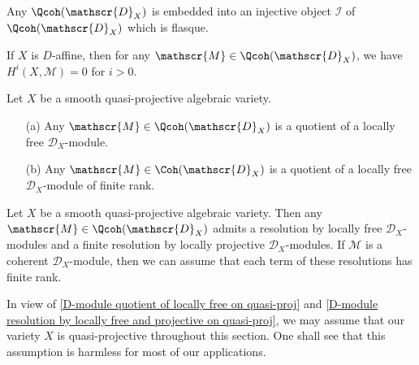 \begin{proposition}\label{D-module qcoh module flasque resolution}
Any $\Qcoh(\mathscr{D}_X)$ is embedded into an injective object $\mathscr{I}$ of $\Qcoh(\mathscr{D}_X)$ which is flasque.
\end{proposition}

\begin{corollary}\label{D-module cohomology trivial for D-affine}
If $X$ is $D$-affine, then for any $\mathscr{M}\in\Qcoh(\mathscr{D}_X)$, we have $H^i(X,\mathscr{M})=0$ for $i>0$.
\end{corollary}

\begin{proposition}\label{D-module quotient of locally free on quasi-proj}
Let $X$ be a smooth quasi-projective algebraic variety.
\begin{enumerate}
    \item[(a)] Any $\mathscr{M}\in\Qcoh(\mathscr{D}_X)$ is a quotient of a locally free $\mathscr{D}_X$-module.
    \item[(b)] Any $\mathscr{M}\in\Coh(\mathscr{D}_X)$ is a quotient of a locally free $\mathscr{D}_X$-module of finite rank.
\end{enumerate}
\end{proposition}

\begin{corollary}\label{D-module resolution by locally free and projective on quasi-proj}
Let $X$ be a smooth quasi-projective algebraic variety. Then any $\mathscr{M}\in\Qcoh(\mathscr{D}_X)$ admits a resolution by locally free $\mathscr{D}_X$-modules and a finite resolution by locally projective $\mathscr{D}_X$-modules. If $\mathscr{M}$ is a coherent $\mathscr{D}_X$-module, then we can assume that each term of these resolutions has finite rank.
\end{corollary}

\begin{remark}
In view of \cref{D-module quotient of locally free on quasi-proj} and \cref{D-module resolution by locally free and projective on quasi-proj}, we may assume that our variety $X$ is quasi-projective throughout this section. One shall see that this assumption is harmless for most of our applications.
\end{remark}

